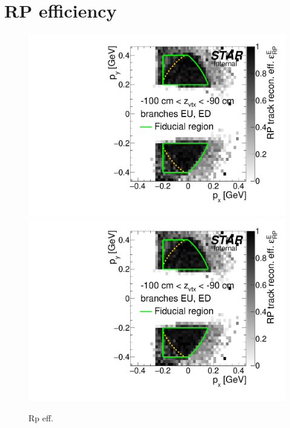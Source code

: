 
\chapter{RP efficiency}\label{appendix:rpEff}

\begin{figure}[hb]
\caption[RP eff]{Rp eff.}\label{fig:rpEff}
\centering
\parbox{0.495\textwidth}{
  \centering
  \includegraphics[width=\linewidth,page=3]{graphics/corrections/mcEffPxPy.pdf}\\
  \includegraphics[width=\linewidth,page=5]{graphics/corrections/mcEffPxPy.pdf}\\
}
\end{figure}
